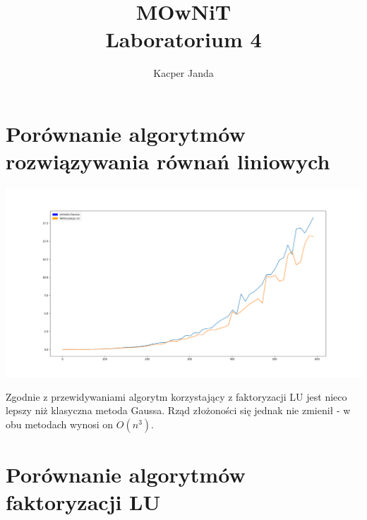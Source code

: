 \documentclass[11pt, a4paper]{article}
\begin{document}
\title{MOwNiT\\Laboratorium 4}
\author{Kacper Janda}
\maketitle

\section{Porównanie algorytmów rozwiązywania równań liniowych}

\begin{center}
\includegraphics[scale=0.3]{Figure_2}
\end{center}

Zgodnie z przewidywaniami algorytm korzystający z faktoryzacji LU jest nieco lepszy niż klasyczna metoda Gaussa. Rząd złożoności się jednak nie zmienił - w obu metodach wynosi on \begin{math} O(n^3) \end{math}. 


\section{Porównanie algorytmów faktoryzacji LU}
\end{document}
